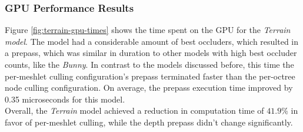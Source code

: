 \subsubsection*{GPU Performance Results} \label{subsubsec-gpu-performance-results-terrain}

Figure \ref{fig:terrain-gpu-times} shows the time spent on the \ac{GPU} for the \emph{Terrain model}.
The model had a considerable amount of best occluders, which resulted in a prepass, which was similar 
in duration to other models with high best occluder counts, like the \emph{Bunny}. In contrast to 
the models discussed before, this time the per-meshlet culling configuration's prepass terminated faster 
than the per-octree node culling configuration. On average, the prepass execution time improved by 0.35 
microseconds for this model. \\

\noindent
Overall, the \emph{Terrain} model achieved a reduction in computation time of $41.9\%$ in favor of per-meshlet 
culling, while the depth prepass didn't change significantly.


